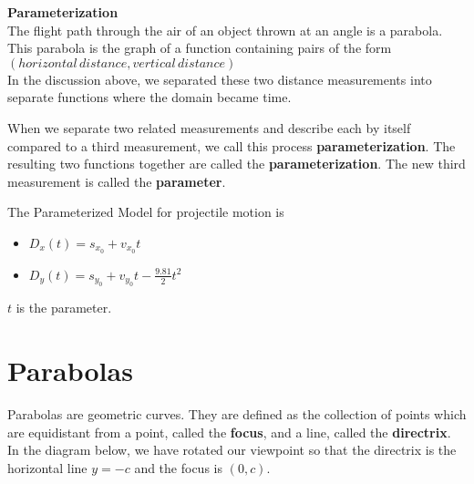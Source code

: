 \documentclass{ximera}
\begin{document}
\begin{definition} \textbf{\textcolor{green!50!black}{Parameterization}} \\

The flight path through the air of an object thrown at an angle is a parabola.  This parabola is the graph of a function containing pairs of the form $(horizontal \, distance, vertical \,distance)$ \\

In the discussion above, we separated these two distance measurements into separate functions where the domain became time.



When we separate two related measurements and describe each by itself compared to a third measurement, we call this process \textbf{parameterization}.  The resulting two functions together are called the \textbf{parameterization}.  The new third measurement is called the \textbf{parameter}.





\begin{model} 


The Parameterized Model for projectile motion is


\begin{itemize}
\item $D_x(t) = s_{x_0} + v_{x_0} t$
\item $D_y(t) = s_{y_0} + v_{y_0} t - \frac{9.81}{2} t^2$
\end{itemize}

$t$ is the parameter.

\end{model}



\end{definition}

















\section{Parabolas}

Parabolas are geometric curves.  They are defined as the collection of points which are equidistant from a point, called the \textbf{focus}, and a line, called the \textbf{directrix}.  In the diagram below,  we have rotated our viewpoint so that the directrix is the horizontal line $y = -c$ and the focus is $(0,c)$.
\end{document}
